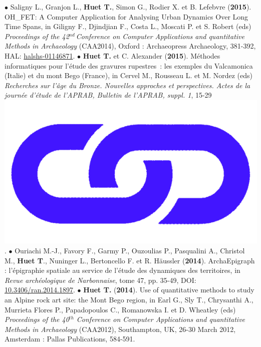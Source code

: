 \documentclass{article}
\begin{document}
\smallbreak
$\bullet$ Saligny L., Granjon L., \textbf{Huet T.}, Simon G., Rodier X. et B. Lefebvre (\textbf{2015}). OH\_FET: A Computer Application for Analysing Urban Dynamics Over Long Time Spans, in Giligny F., Djindjian F., Costa L., Moscati P. et S. Robert (eds) \textit{Proceedings of the 42${}^{nd\ }$Conference on Computer Applications and quantitative Methods in Archaeology} (CAA2014), Oxford : Archaeopress Archaeology, 381-392, HAL: \href{https://hal.archives-ouvertes.fr/halshs-01146871}{halshs-01146871}.
\smallbreak
$\bullet$ \textbf{Huet T.} et C. Alexander (\textbf{2015}). M\'{e}thodes informatiques pour l'\'{e}tude des gravures rupestres~: les exemples du Valcamonica (Italie) et du mont Bego (France), in Cervel M., Rousseau L. et M. Nordez (eds) \textit{Recherches sur l'\^{a}ge du Bronze. Nouvelles approches et perspectives. Actes de la journ\'{e}e d'\'{e}tude de l'APRAB, Bulletin de l'APRAB, suppl. 1}, 15-29 
\href{https://www.researchgate.net/publication/347437308_Methodes_informatiques_pour_l'etude_des_gravures_rupestres_les_exemples_du_Valcamonica_Italie_et_du_mont_Bego_France}{\includegraphics[scale=0.02]{link_darkblue.png}}.
\smallbreak
$\bullet$ Ouriachi M.-J., Favory F., Garmy P., Ouzoulias P., Pasqualini A., Christol M., \textbf{Huet T}., Nuninger L., Bertoncello F. et R. H\"{a}ussler (\textbf{2014}). ArchaEpigraph : l'\'{e}pigraphie spatiale au service de l'\'{e}tude des dynamiques des territoires, in \textit{Revue arch\'{e}ologique de Narbonnaise}, tome 47, pp. 35-49, DOI: \href{https://doi.org/10.3406/ran.2014.1897}{10.3406/ran.2014.1897}.
\smallbreak
$\bullet$ \textbf{Huet T.} (\textbf{2014}). Use of quantitative methods to study an Alpine rock art site: the Mont Bego region, in Earl G., Sly T., Chrysanthi A., Murrieta Flores P., Papadopoulos C., Romanowska I. et D. Wheatley (eds) \textit{Proceedings of the 40${}^{th}$ Conference on Computer Applications and quantitative Methods in Archaeology} (CAA2012), Southampton, UK, 26-30 March 2012, Amsterdam : Pallas Publications, 584-591.
\end{document}
